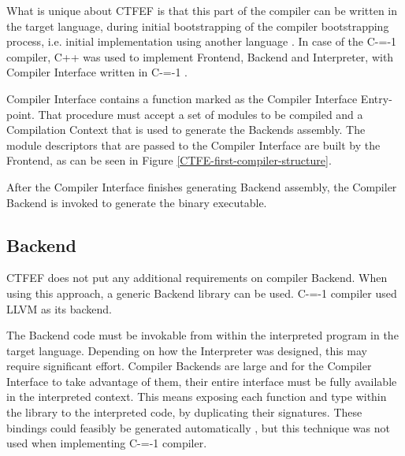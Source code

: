 What is unique about CTFEF is that this part of the compiler can be written in the target language, during initial bootstrapping of the compiler bootstrapping process, i.e. initial implementation using another language \cite{puntambekar:compiler_design,novillo2007gcc}.
In case of the C-=-1 compiler, C++ was used to implement Frontend, Backend and Interpreter, with Compiler Interface written in C-=-1 \cite{grabski2022compilation}.

Compiler Interface contains a function marked as the Compiler Interface Entry-point.
That procedure must accept a set of modules to be compiled and a Compilation Context that is used to generate the Backends assembly.
The module descriptors that are passed to the Compiler Interface are built by the Frontend, as can be seen in Figure \ref{CTFE-first-compiler-structure}.

After the Compiler Interface finishes generating Backend assembly, the Compiler Backend is invoked to generate the binary executable.
\subsection{Backend}
\label{Backend}

CTFEF does not put any additional requirements on compiler Backend.
When using this approach, a generic Backend library can be used.
C-=-1 compiler used LLVM\cite{lattner2008llvm} as its backend.

The Backend code must be invokable from within the interpreted program in the target language.
Depending on how the Interpreter was designed, this may require significant effort. %
Compiler Backends are large and for the Compiler Interface to take advantage of them, their entire interface must be fully available in the interpreted context.
This means exposing each function and type within the library to the interpreted code, by duplicating their signatures.
These bindings could feasibly be generated automatically \cite{marshalling_auto_generation}, but this technique was not used when implementing C-=-1 compiler.
